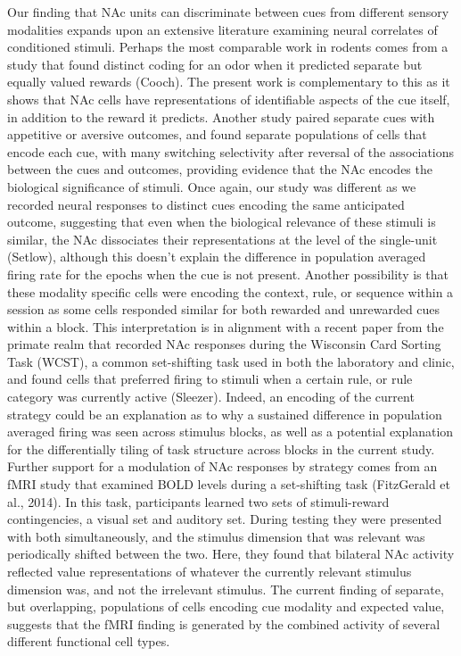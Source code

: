 \documentclass[11pt]{article}
\begin{document}
Our finding that NAc units can discriminate between cues from different sensory modalities expands upon an extensive literature examining neural correlates of conditioned stimuli. Perhaps the most comparable work in rodents comes from a study that found distinct coding for an odor when it predicted separate but equally valued rewards (Cooch). The present work is complementary to this as it shows that NAc cells have representations of identifiable aspects of the cue itself, in addition to the reward it predicts. Another study paired separate cues with appetitive or aversive outcomes, and found separate populations of cells that encode each cue, with many switching selectivity after reversal of the associations between the cues and outcomes, providing evidence that the NAc encodes the biological significance of stimuli. Once again, our study was different as we recorded neural responses to distinct cues encoding the same anticipated outcome, suggesting that even when the biological relevance of these stimuli is similar, the NAc dissociates their representations at the level of the single-unit (Setlow), although this doesn’t explain the difference in population averaged firing rate for the epochs when the cue is not present. Another possibility is that these modality specific cells were encoding the context, rule, or sequence within a session as some cells responded similar for both rewarded and unrewarded cues within a block. This interpretation is in alignment with a recent paper from the primate realm that recorded NAc responses during the Wisconsin Card Sorting Task (WCST), a common set-shifting task used in both the laboratory and clinic, and found cells that preferred firing to stimuli when a certain rule, or rule category was currently active (Sleezer). Indeed, an encoding of the current strategy could be an explanation as to why a sustained difference in population averaged firing was seen across stimulus blocks, as well as a potential explanation for the differentially tiling of task structure across blocks in the current study. Further support for a modulation of NAc responses by strategy comes from an fMRI study that examined BOLD levels during a set-shifting task (FitzGerald et al., 2014). In this task, participants learned two sets of stimuli-reward contingencies, a visual set and auditory set. During testing they were presented with both simultaneously, and the stimulus dimension that was relevant was periodically shifted between the two. Here, they found that bilateral NAc activity reflected value representations of whatever the currently relevant stimulus dimension was, and not the irrelevant stimulus. The current finding of separate, but overlapping, populations of cells encoding cue modality and expected value, suggests that the fMRI finding is generated by the combined activity of several different functional cell types.
\end{document}
